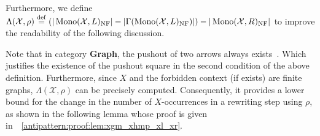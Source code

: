 \begin{definition}
\begin{itemize}
\begin{figure}
{
         }
         \caption{}
         \label{fig:antipattern:def:gamma_l_rho_x}
            \end{figure}
    \end{itemize}
    Furthermore, we define $\Lambda(\mathcal{X},\rho) \overset{\operatorname{def}}{=} (|\operatorname{Mono}(\mathcal{X},L)_{\operatorname{NF}}| - 
    |\Gamma(\operatorname{Mono}(\mathcal{X},L)_{\operatorname{NF}})|) -
   |\operatorname{Mono}(\mathcal{X},R)_{\operatorname{NF}}|$ to improve the readability of the following discussion.
\end{definition}
Note that in category \textbf{Graph}, the pushout of two arrows always exists~\cite[p.188]{corradini1997algebraic}. Which justifies the existence of the pushout square in the second condition of the above definition.
Furthermore, since $X$ and the forbidden context (if exists) are finite graphs, $\Lambda(\mathcal{X},\rho)$ can be precisely computed. Consequently, it provides a lower bound for the change in the number of $X$-occurrences in a rewriting step using $\rho$, as shown in the following lemma whose proof is given in~\textsection~\ref{antipattern:proof:lem:xgm_xhmp_xl_xr}.

